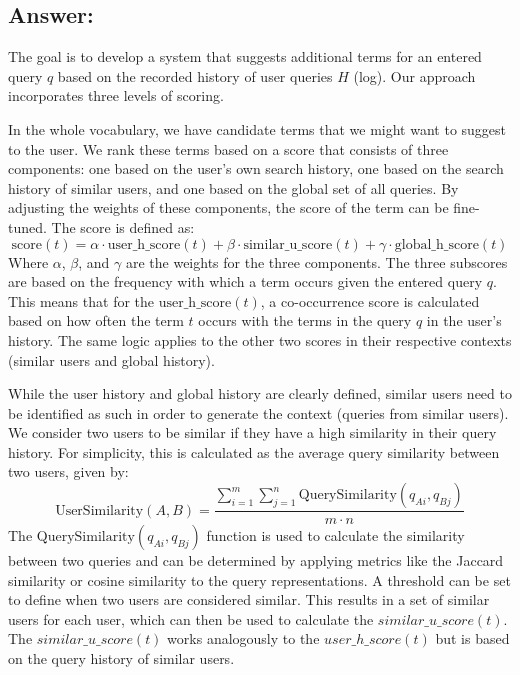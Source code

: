 \subsection*{Answer:}

The goal is to develop a system that suggests additional terms for an entered query $q$ based on the recorded history of user queries $H$ (log). Our approach incorporates three levels of scoring.

In the whole vocabulary, we have candidate terms that we might want to suggest to the user. We rank these terms based on a score that consists of three components: one based on the user's own search history, one based on the search history of similar users, and one based on the global set of all queries. By adjusting the weights of these components, the score of the term can be fine-tuned.  
The score is defined as: $$\text{score}(t) = \alpha \cdot \text{user\_h\_score}(t) + \beta \cdot \text{similar\_u\_score}(t) + \gamma \cdot \text{global\_h\_score}(t)$$ Where $\alpha$, $\beta$, and $\gamma$ are the weights for the three components.  
The three subscores are based on the frequency with which a term occurs given the entered query $q$. This means that for the $\text{user\_h\_score}(t)$, a co-occurrence score is calculated based on how often the term $t$ occurs with the terms in the query $q$ in the user's history. The same logic applies to the other two scores in their respective contexts (similar users and global history).


While the user history and global history are clearly defined, similar users need to be identified as such in order to generate the context (queries from similar users).  
We consider two users to be similar if they have a high similarity in their query history. For simplicity, this is calculated as the average query similarity between two users, given by: $$\text{UserSimilarity}(A, B) = \frac{\sum_{i=1}^m \sum_{j=1}^n \text{QuerySimilarity}(q_{Ai}, q_{Bj})}{m \cdot n}$$ The $\text{QuerySimilarity}(q_{Ai}, q_{Bj})$ function is used to calculate the similarity between two queries and can be determined by applying metrics like the Jaccard similarity or cosine similarity to the query representations. A threshold can be set to define when two users are considered similar. This results in a set of similar users for each user, which can then be used to calculate the $similar\_u\_score(t)$. The $similar\_u\_score(t)$ works analogously to the $user\_h\_score(t)$ but is based on the query history of similar users.

